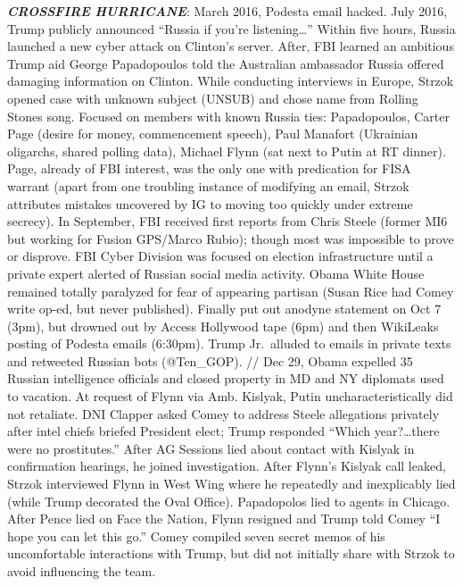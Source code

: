 \documentclass[
]{article}
\begin{document}
\textbf{\emph{CROSSFIRE HURRICANE}}: March 2016, Podesta email hacked.
July 2016, Trump publicly announced ``Russia if you're
listening\ldots{}'' Within five hours, Russia launched a new cyber
attack on Clinton's server. After, FBI learned an ambitious Trump aid
George Papadopoulos told the Australian ambassador Russia offered
damaging information on Clinton. While conducting interviews in Europe,
Strzok opened case with unknown subject (UNSUB) and chose name from
Rolling Stones song. Focused on members with known Russia ties:
Papadopoulos, Carter Page (desire for money, commencement speech), Paul
Manafort (Ukrainian oligarchs, shared polling data), Michael Flynn (sat
next to Putin at RT dinner). Page, already of FBI interest, was the only
one with predication for FISA warrant (apart from one troubling instance
of modifying an email, Strzok attributes mistakes uncovered by IG to
moving too quickly under extreme secrecy). In September, FBI received
first reports from Chris Steele (former MI6 but working for Fusion
GPS/Marco Rubio); though most was impossible to prove or disprove. FBI
Cyber Division was focused on election infrastructure until a private
expert alerted of Russian social media activity. Obama White House
remained totally paralyzed for fear of appearing partisan (Susan Rice
had Comey write op-ed, but never published). Finally put out anodyne
statement on Oct 7 (3pm), but drowned out by Access Hollywood tape (6pm)
and then WikiLeaks posting of Podesta emails (6:30pm). Trump Jr.~alluded
to emails in private texts and retweeted Russian bots (@Ten\_GOP). //
Dec 29, Obama expelled 35 Russian intelligence officials and closed
property in MD and NY diplomats used to vacation. At request of Flynn
via Amb. Kislyak, Putin uncharacteristically did not retaliate. DNI
Clapper asked Comey to address Steele allegations privately after intel
chiefs briefed President elect; Trump responded ``Which
year?\ldots there were no prostitutes.'' After AG Sessions lied about
contact with Kislyak in confirmation hearings, he joined investigation.
After Flynn's Kislyak call leaked, Strzok interviewed Flynn in West Wing
where he repeatedly and inexplicably lied (while Trump decorated the
Oval Office). Papadopolos lied to agents in Chicago. After Pence lied on
Face the Nation, Flynn resigned and Trump told Comey ``I hope you can
let this go.'' Comey compiled seven secret memos of his uncomfortable
interactions with Trump, but did not initially share with Strzok to
avoid influencing the team.
\end{document}
